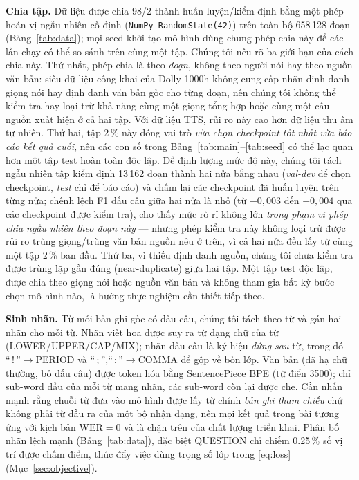 \documentclass[conference,onecolumn]{IEEEtran}
\begin{document}
\textbf{Chia tập.} Dữ liệu được chia 98/2 thành huấn luyện/kiểm định bằng một
phép hoán vị ngẫu nhiên cố định (\texttt{NumPy RandomState(42)}) trên toàn bộ
658\,128 đoạn (Bảng~\ref{tab:data}); mọi seed khởi tạo mô hình dùng chung phép
chia này để các lần chạy có thể so sánh trên cùng một tập. Chúng tôi nêu rõ ba
giới hạn của cách chia này. Thứ nhất, phép chia là theo \emph{đoạn}, không theo
người nói hay theo nguồn văn bản: siêu dữ liệu công khai của Dolly-1000h không
cung cấp nhãn định danh giọng nói hay định danh văn bản gốc cho từng đoạn, nên
chúng tôi không thể kiểm tra hay loại trừ khả năng cùng một giọng tổng hợp hoặc
cùng một câu nguồn xuất hiện ở cả hai tập. Với dữ liệu TTS, rủi ro này cao hơn
dữ liệu thu âm tự nhiên. Thứ hai, tập 2\,\% này đóng vai trò \emph{vừa chọn
checkpoint tốt nhất vừa báo cáo kết quả cuối}, nên các con số trong
Bảng~\ref{tab:main}--\ref{tab:seed} có thể lạc quan hơn một tập test hoàn toàn
độc lập. Để định lượng mức độ này, chúng tôi tách ngẫu nhiên tập kiểm định
13\,162 đoạn thành hai nửa bằng nhau (\emph{val-dev} để chọn checkpoint,
\emph{test} chỉ để báo cáo) và chấm lại các checkpoint đã huấn luyện trên từng
nửa; chênh lệch F1 dấu câu giữa hai nửa là nhỏ (từ $-0{,}003$ đến $+0{,}004$
qua các checkpoint được kiểm tra), cho thấy mức rò rỉ không lớn \emph{trong
phạm vi phép chia ngẫu nhiên theo đoạn này} --- nhưng phép kiểm tra này không
loại trừ được rủi ro trùng giọng/trùng văn bản nguồn nêu ở trên, vì cả hai nửa
đều lấy từ cùng một tập 2\,\% ban đầu. Thứ ba, vì thiếu định danh nguồn, chúng
tôi chưa kiểm tra được trùng lặp gần đúng (near-duplicate) giữa hai tập. Một
tập test độc lập, được chia theo giọng nói hoặc nguồn văn bản và không tham
gia bất kỳ bước chọn mô hình nào, là hướng thực nghiệm cần thiết tiếp theo.

\textbf{Sinh nhãn.} Từ mỗi bản ghi gốc có dấu câu, chúng tôi tách theo từ và gán
hai nhãn cho mỗi từ. Nhãn viết hoa được suy ra từ dạng chữ của từ
(LOWER/UPPER/CAP/MIX); nhãn dấu câu là ký hiệu \emph{đứng sau} từ, trong đó
``\,!\,''$\rightarrow$PERIOD và ``\,;\,'',``\,:\,''$\rightarrow$COMMA để gộp về
bốn lớp. Văn bản (đã hạ chữ thường, bỏ dấu câu) được token hóa bằng SentencePiece
BPE (từ điển 3500); chỉ sub-word đầu của mỗi từ mang nhãn, các sub-word còn lại
được che. Cần nhấn mạnh rằng chuỗi từ đưa vào mô hình được lấy từ chính \emph{bản ghi
tham chiếu} chứ không phải từ đầu ra của một bộ nhận dạng, nên mọi kết quả trong bài
tương ứng với kịch bản $\mathrm{WER}=0$ và là chặn trên của chất lượng triển khai. Phân bố nhãn lệch mạnh (Bảng~\ref{tab:data}), đặc biệt QUESTION chỉ
chiếm 0.25\,\% số vị trí được chấm điểm, thúc đẩy việc dùng trọng số lớp trong \eqref{eq:loss}
(Mục~\ref{sec:objective}).
\end{document}
